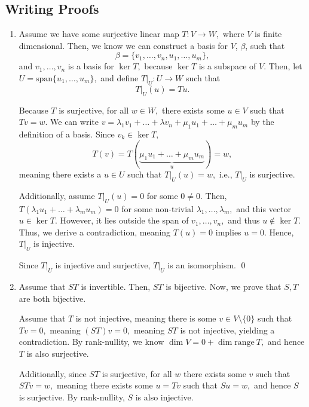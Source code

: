 \documentclass[12pt]{article}
\begin{document}
\subsection{Writing Proofs}
\begin{enumerate}
  \item Assume we have some surjective linear map $T : V \to W,$
    where $V$ is finite dimensional. Then, we know we can construct a
    basis for $V$, $\beta$, such that
    $$
    \beta = \{v_1, \ldots, v_n, u_1, \ldots, u_m\},
    $$
    and $v_1, \ldots, v_n$ is a basis for $\ker T,$ because $\ker T$
    is a subspace of $V.$ Then, let $U = \text{span} \{ u_1, \ldots, u_m\},$ and
    define $T|_U : U \to W$ such that
    $$
    T|_U(u) = Tu.
    $$

    Because $T$ is surjective, for all $w \in W,$ there exists some
    $u \in V$ such that $Tv = w.$ We can write $v = \lambda_1 v_1 +
    \ldots + \lambda v_n + \mu_1 u_1 + \ldots + \mu_m u_m$ by the
    definition of a basis. Since $v_k \in \ker T,$
    $$
    T(v) = T(\underbrace{\mu_1 u_1 + \ldots + \mu_m u_m}_{u}) = w,
    $$
    meaning there exists a $u \in U$ such that $T|_U(u) = w,$ i.e.,
    $T|_U$ is surjective.

    Additionally, assume $T|_U(u) = 0$ for some $0 \neq 0.$ Then,
    $T(\lambda_1u_1 + \ldots + \lambda_m u_m) = 0$ for some
    non-trivial $\lambda_1, \ldots, \lambda_m,$ and this vector $u
    \in \ker T.$ However, it lies outside the span of $v_1, \ldots,
    v_n,$ and thus $u \not \in \ker T.$ Thus, we derive a
    contradiction, meaning $T(u) = 0$ implies $u = 0.$ Hence, $T|_U$
    is injective.

    Since $T|_U$ is injective and surjective, $T|_U$ is an isomorphism. \qed

  \item Assume that $ST$ is invertible. Then, $ST$ is bijective. Now,
    we prove that $S, T$ are both bijective.

    Assume that $T$ is not injective, meaning there is some $v \in V
    \setminus \{0\}$ such that $Tv = 0,$ meaning $(ST)v = 0,$ meaning
    $ST$ is not injective, yielding a contradiction. By rank-nullity,
    we know $\dim V = 0 + \dim \text{range} \ T,$ and hence $T$ is
    also surjective.

    Additionally, since $ST$ is surjective, for all $w$ there exists
    some $v$ such that $STv =w ,$ meaning there exists some $u = Tv$
    such that $Su = w,$ and hence $S$ is surjective. By rank-nullity,
    $S$ is also injective.


\end{enumerate}
\end{document}

